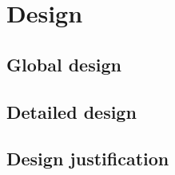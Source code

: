 \documentclass[../main.tex]{subfiles}
\begin{document}
\pagebreak
\section{Design}
    
    \subsection{Global design}
    
    \subsection{Detailed design}
    
    \subsection{Design justification}
\end{document}

